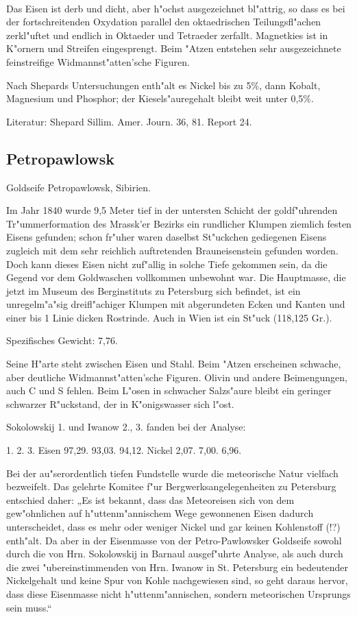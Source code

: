 \documentclass[a4paper, 11pt, oneside]{article}
\begin{document}
\paragraph{}
Das Eisen ist derb und dicht, aber h"ochst ausgezeichnet bl"attrig, so dass es bei der fortschreitenden Oxydation parallel den oktaedrischen Teilungsfl"achen zerkl"uftet und endlich in Oktaeder und Tetraeder zerfallt. Magnetkies ist in K"ornern und Streifen eingesprengt. Beim "Atzen entstehen sehr ausgezeichnete feinstreifige Widmannst"atten'sche Figuren.

Nach Shepards Untersuchungen enth"alt es Nickel bis zu 5\%, dann Kobalt, Magnesium und Phosphor; der Kiesels"auregehalt bleibt weit unter 0,5\%.

Literatur: Shepard Sillim. Amer. Journ. 36, 81. Report 24.

\subsection{Petropawlowsk}

Goldseife Petropawlowsk, Sibirien.

Im Jahr 1840 wurde 9,5 Meter tief in der untersten Schicht der goldf"uhrenden Tr"ummerformation des Mrassk'er Bezirks ein rundlicher Klumpen ziemlich festen Eisens gefunden; schon fr"uher waren daselbst St"uckchen gediegenen Eisens zugleich mit dem sehr reichlich auftretenden Brauneisenstein gefunden worden. Doch kann dieses Eisen nicht zuf"allig in solche Tiefe gekommen sein, da die Gegend vor dem Goldwaschen vollkommen unbewohnt war. Die Hauptmasse, die jetzt im Museum des Berginstituts zu Petersburg sich befindet, ist ein unregelm"a"sig dreifl"achiger Klumpen mit abgerundeten Ecken und Kanten und einer bis 1 Linie dicken Rostrinde. Auch in Wien ist ein St"uck (118,125 Gr.).

Spezifisches Gewicht: 7,76.

Seine H"arte steht zwischen Eisen und Stahl. Beim "Atzen erscheinen schwache, aber deutliche Widmannst"atten'sche Figuren. Olivin und andere Beimengungen, auch C und S fehlen. Beim L"osen in schwacher Salzs"aure bleibt ein geringer schwarzer R"uckstand, der in K"onigswasser sich l"ost.

Sokolowskij 1. und Iwanow 2., 3. fanden bei der Analyse:

1. 2. 3.  
Eisen 97,29. 93,03. 94,12.  
Nickel 2,07. 7,00. 6,96.

Bei der au"serordentlich tiefen Fundstelle wurde die meteorische Natur vielfach bezweifelt. Das gelehrte Komitee f"ur Bergwerksangelegenheiten zu Petersburg entschied daher: „Es ist bekannt, dass das Meteoreisen sich von dem gew"ohnlichen auf h"uttenm"annischem Wege gewonnenen Eisen dadurch unterscheidet, dass es mehr oder weniger Nickel und gar keinen Kohlenstoff (!?) enth"alt. Da aber in der Eisenmasse von der Petro-Pawlowsker Goldseife sowohl durch die von Hrn. Sokolowskij in Barnaul ausgef"uhrte Analyse, als auch durch die zwei "ubereinstimmenden von Hrn. Iwanow in St. Petersburg ein bedeutender Nickelgehalt und keine Spur von Kohle nachgewiesen sind, so geht daraus hervor, dass diese Eisenmasse nicht h"uttenm"annischen, sondern meteorischen Ursprungs sein muss.“
\end{document}
